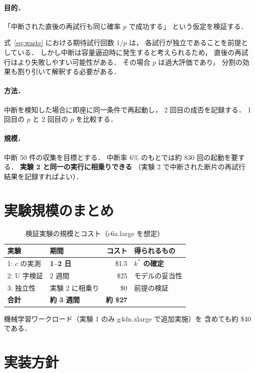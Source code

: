 \documentclass[11pt,a4paper]{ltjsreport}
\begin{document}
\paragraph{目的．}
「中断された直後の再試行も同じ確率 $p$ で成功する」
という仮定を検証する．

式~\eqref{eq:waste} における期待試行回数 $1/p$ は，
各試行が独立であることを前提としている．
しかし中断は容量逼迫時に発生すると考えられるため，
直後の再試行はより失敗しやすい可能性がある．
その場合 $p$ は過大評価であり，
分割の効果も割り引いて解釈する必要がある．

\paragraph{方法．}
中断を検知した場合に即座に同一条件で再起動し，
2 回目の成否を記録する．
1 回目の $p$ と 2 回目の $p$ を比較する．

\paragraph{規模．}
中断 50 件の収集を目標とする．
中断率 6\% のもとでは約 830 回の起動を要する．
\textbf{実験 2 と同一の実行に相乗りできる}
（実験 2 で中断された断片の再試行結果を記録すればよい）．

\section{実験規模のまとめ}

\begin{table}[htbp]
\centering
\caption{検証実験の規模とコスト（c6a.large を想定）}
\label{tab:exp_scale}
\small
\begin{tabularx}{\textwidth}{@{}llrX@{}}
\toprule
実験 & 期間 & コスト & 得られるもの \\
\midrule
1: $c$ の実測   & \textbf{1--2 日} & \$1.5 & \textbf{$k^{*}$ の確定} \\
2: U 字検証     & 2 週間 & \$25 & モデルの妥当性 \\
3: 独立性       & 実験 2 に相乗り & \$0 & 前提の検証 \\
\midrule
\textbf{合計}   & \textbf{約 3 週間} & \textbf{約 \$27} & \\
\bottomrule
\end{tabularx}
\end{table}

機械学習ワークロード（実験 1 のみ g4dn.xlarge で追加実施）を
含めても約 \$40 である．

\section{実装方針}
\end{document}
